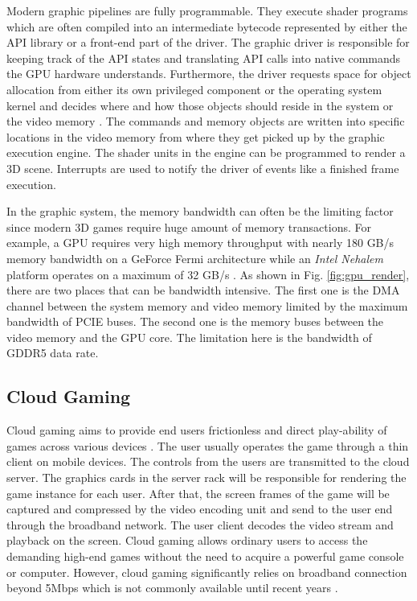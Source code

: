 \documentclass[pageno]{jpaper}
\begin{document}
Modern graphic pipelines are fully programmable. They
execute shader programs which are often compiled
into an intermediate bytecode represented by either the API
library or a front-end part of the driver.
The graphic driver is responsible for keeping track of the API states and translating API calls
into native commands the GPU hardware understands. Furthermore,
the driver requests space for object allocation from either its
own privileged component or the operating system kernel and
decides where and how those objects should reside in the system
or the video memory \cite{gem} \cite{atidriver}. The commands and memory objects are written
into specific locations in the video memory from where they get
picked up by the graphic execution engine. The shader
units in the engine can be programmed to render a 3D scene. Interrupts are used to
notify the driver of events like a finished frame execution.

In the graphic system, the memory bandwidth can often be the limiting factor since modern 3D games require huge amount of memory transactions. For example, a GPU requires very high memory throughput with nearly 180 GB/s memory bandwidth
on a GeForce Fermi architecture \cite{gpulatency} while an \emph{Intel
Nehalem} platform operates on a maximum of 32 GB/s \cite{nehalempage}. As shown in Fig. \ref{fig:gpu_render}, there are two places that can be bandwidth intensive. The first one is the DMA channel between the system memory and video memory limited by the maximum bandwidth of PCIE buses. The second one is the memory buses between the video memory and the GPU core. The limitation here is the bandwidth of GDDR5 data rate.


\subsection {Cloud Gaming}

Cloud gaming aims to provide end users frictionless and direct play-ability of games across various devices \cite{wiki}. The user usually operates the game through a thin client on mobile devices. The controls from the users are transmitted to the cloud server. The graphics cards in the server rack will be responsible for rendering the game instance for each user. After that, the screen frames of the game will be captured and compressed by the video encoding unit and send to the user end through the broadband network. The user client decodes the video stream and playback on the screen. Cloud gaming allows ordinary users to access the demanding high-end games without the need to acquire a powerful game console or computer. However, cloud gaming significantly relies on broadband connection beyond 5Mbps which is not commonly available until recent years \cite{chen14:cloud_gaming_qos}\cite{chen11:cloudgaming}.
\end{document}

